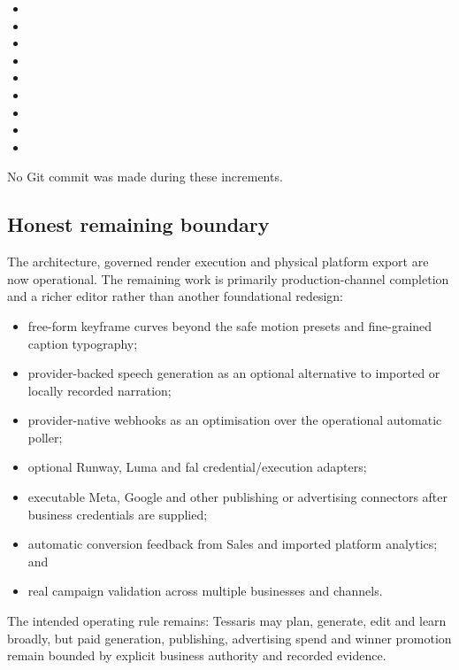 \begin{itemize}
    \item {}
    \item {}
    \item {}
    \item {}
    \item {}
    \item {}
    \item {}
    \item {}
    \item {}
\end{itemize}

No Git commit was made during these increments.

\subsection{Honest remaining boundary}

The architecture, governed render execution and physical platform export are now
operational. The remaining work is primarily production-channel completion and a
richer editor rather than another foundational redesign:

\begin{itemize}
    \item free-form keyframe curves beyond the safe motion presets and fine-grained caption typography;
    \item provider-backed speech generation as an optional alternative to imported or locally recorded narration;
    \item provider-native webhooks as an optimisation over the operational automatic poller;
    \item optional Runway, Luma and fal credential/execution adapters;
    \item executable Meta, Google and other publishing or advertising connectors after business credentials are supplied;
    \item automatic conversion feedback from Sales and imported platform analytics; and
    \item real campaign validation across multiple businesses and channels.
\end{itemize}

The intended operating rule remains: Tessaris may plan, generate, edit and learn
broadly, but paid generation, publishing, advertising spend and winner promotion
remain bounded by explicit business authority and recorded evidence.
